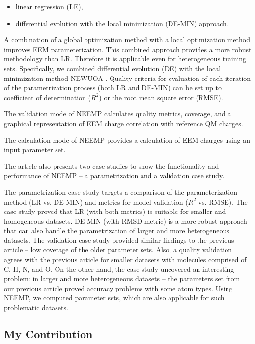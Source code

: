 \begin{itemize}
    \item linear regression (LE),
    \item differential evolution with the local minimization (DE-MIN) approach. 
\end{itemize}

A combination of a global optimization method with a local optimization method
improves EEM parameterization. This combined approach provides a more robust
methodology than LR. Therefore it is applicable even for heterogeneous training
sets. Specifically, we combined differential evolution (DE) \cite{Storn1997} with the local
minimization method NEWUOA \cite{Zaslavski2006}. Quality criteria for evaluation of each 
iteration of the parametrization process (both LR and DE-MIN) can be set up to
coefficient of determination ($R^2$) or the root mean square error (RMSE).

The validation mode of NEEMP calculates quality metrics, coverage, and a
graphical representation of EEM charge correlation with reference QM charges.

The calculation mode of NEEMP provides a calculation of EEM charges using an
input parameter set.

The article also presents two case studies to show the functionality and
performance of NEEMP – a parametrization and a validation case study.

The parametrization case study targets a comparison of the parameterization
method (LR vs. DE-MIN) and metrics for model validation ($R^2$ vs. RMSE).
The case study proved that LR (with both metrics) is suitable for smaller
and homogeneous datasets. DE-MIN (with RMSD metric) is a more robust approach
that can also handle the parametrization of larger and more heterogeneous
da\-ta\-sets. The validation case study provided similar findings to the previous
article -- low coverage of the older parameter sets. Also, a quality validation
agrees with the previous article for smaller datasets with molecules comprised
of C, H, N, and O. On the other hand, the case study uncovered an interesting
problem: in larger and more heterogeneous datasets -- the parameters set from
our previous article proved accuracy problems with some atom types. Using NEEMP,
we computed parameter sets, which are also applicable for such problematic
datasets.

\subsection{My Contribution}


